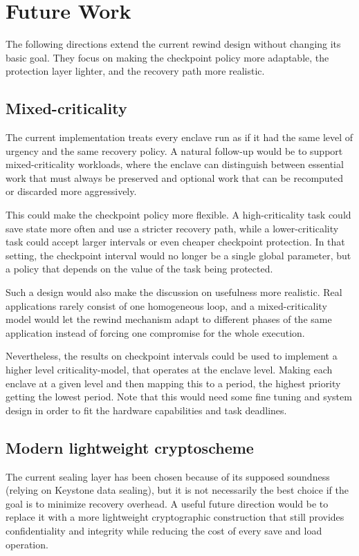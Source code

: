 \documentclass[11pt,a4paper]{report}
\begin{document}
\section{Future Work}

The following directions extend the current rewind design without changing its basic goal.
They focus on making the checkpoint policy more adaptable, the protection layer lighter, and the recovery path more realistic.

\subsection{Mixed-criticality}
The current implementation treats every enclave run as if it had the same level of urgency and the same recovery policy. 
A natural follow-up would be to support mixed-criticality workloads, where the enclave can distinguish between essential work that must always be preserved and optional work that can be recomputed or discarded more aggressively.

This could make the checkpoint policy more flexible. A high-criticality task could save state more often and use a stricter recovery path, while a lower-criticality task could accept larger intervals or even cheaper checkpoint protection. 
In that setting, the checkpoint interval would no longer be a single global parameter, but a policy that depends on the value of the task being protected.

Such a design would also make the discussion on usefulness more realistic. 
Real applications rarely consist of one homogeneous loop, and a mixed-criticality model would let the rewind mechanism adapt to different phases of the same application instead of forcing one compromise for the whole execution.

Nevertheless, the results on checkpoint intervals could be used to implement a higher level criticality-model, that operates at the enclave level.
Making each enclave at a given level and then mapping this to a period, the highest priority getting the lowest period. 
Note that this would need some fine tuning and system design in order to fit the hardware capabilities and task deadlines.

\subsection{Modern lightweight cryptoscheme}
The current sealing layer has been chosen because of its supposed soundness (relying on Keystone data sealing), but it is not necessarily the best choice if the goal is to minimize recovery overhead. 
A useful future direction would be to replace it with a more lightweight cryptographic construction that still provides confidentiality and integrity while reducing the cost of every save and load operation.
\end{document}

